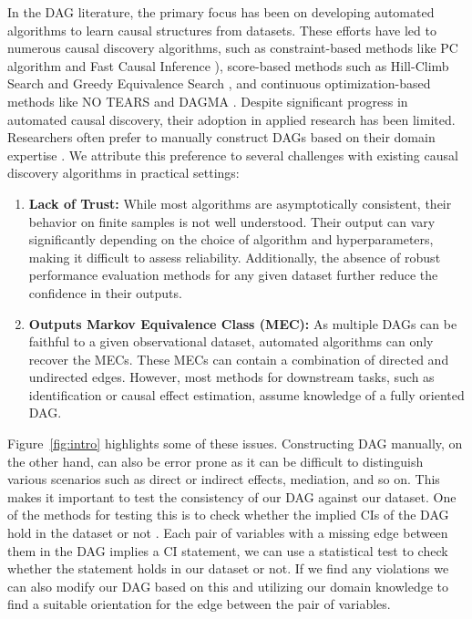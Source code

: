 \documentclass{uai2025} %
\begin{document}
In the DAG literature, the primary focus has been on developing automated
algorithms to learn causal structures from datasets. These efforts have led to
numerous causal discovery algorithms, such as constraint-based methods like PC
algorithm \citep{Spirtes2001} and Fast Causal Inference \citep{Spirtes2000}),
score-based methods such as Hill-Climb Search and Greedy Equivalence Search
\citep{Chickering2002}, and continuous optimization-based methods like NO TEARS
\citep{Zheng2018} and DAGMA \citep{Bello2022}. Despite significant progress in
automated causal discovery, their adoption in applied research has been
limited. Researchers often prefer to manually construct DAGs based on their
domain expertise \citep{Tennant2020, Petersen2021}. We attribute this
preference to several challenges with existing causal discovery algorithms in
practical settings:

\begin{enumerate}
	\item \textbf{Lack of Trust:} While most algorithms are asymptotically
		consistent, their behavior on finite samples is not well
		understood. Their output can vary significantly depending on
		the choice of algorithm and hyperparameters, making it
		difficult to assess reliability. Additionally, the absence of
		robust performance evaluation methods for any given dataset
		further reduce the confidence in their outputs. 
	\item \textbf{Outputs Markov Equivalence Class (MEC):} As multiple
		DAGs can be faithful to a given observational dataset, automated 
		algorithms can only recover the MECs. These MECs can contain a
		combination of directed and undirected edges. However, most
		methods for downstream tasks, such as identification or causal
		effect estimation, assume knowledge of a fully oriented DAG. 
\end{enumerate}

Figure~\ref{fig:intro} highlights some of these issues. Constructing DAG
manually, on the other hand, can also be error prone as it can be difficult to
distinguish various scenarios such as direct or indirect effects, mediation,
and so on. This makes it important to test the consistency of our DAG against
our dataset. One of the methods for testing this is to check whether the
implied CIs of the DAG hold in the dataset or not \citep{Ankan2021}. Each pair
of variables with a missing edge between them in the DAG implies a CI
statement, we can use a statistical test to check whether the statement holds
in our dataset or not. If we find any violations we can also modify our DAG
based on this and utilizing our domain knowledge to find a suitable orientation
for the edge between the pair of variables.
\end{document}
